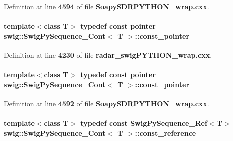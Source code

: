Definition at line {\bf 4594} of file {\bf Soapy\+S\+D\+R\+P\+Y\+T\+H\+O\+N\+\_\+wrap.\+cxx}.

\paragraph[{const\+\_\+pointer}]{\setlength{\rightskip}{0pt plus 5cm}template$<$class T$>$ typedef const {\bf pointer} {\bf swig\+::\+Swig\+Py\+Sequence\+\_\+\+Cont}$<$ T $>$\+::{\bf const\+\_\+pointer}}\label{structswig_1_1SwigPySequence__Cont_ab4ac20f379a9c7793597569834eb3cf9}


Definition at line {\bf 4230} of file {\bf radar\+\_\+swig\+P\+Y\+T\+H\+O\+N\+\_\+wrap.\+cxx}.

\paragraph[{const\+\_\+pointer}]{\setlength{\rightskip}{0pt plus 5cm}template$<$class T$>$ typedef const {\bf pointer} {\bf swig\+::\+Swig\+Py\+Sequence\+\_\+\+Cont}$<$ T $>$\+::{\bf const\+\_\+pointer}}\label{structswig_1_1SwigPySequence__Cont_ab4ac20f379a9c7793597569834eb3cf9}


Definition at line {\bf 4592} of file {\bf Soapy\+S\+D\+R\+P\+Y\+T\+H\+O\+N\+\_\+wrap.\+cxx}.

\paragraph[{const\+\_\+reference}]{\setlength{\rightskip}{0pt plus 5cm}template$<$class T$>$ typedef const {\bf Swig\+Py\+Sequence\+\_\+\+Ref}$<$T$>$ {\bf swig\+::\+Swig\+Py\+Sequence\+\_\+\+Cont}$<$ T $>$\+::{\bf const\+\_\+reference}}\label{structswig_1_1SwigPySequence__Cont_a9c8d1d3acc0234f3a9cbd570ee7e9cf0}


